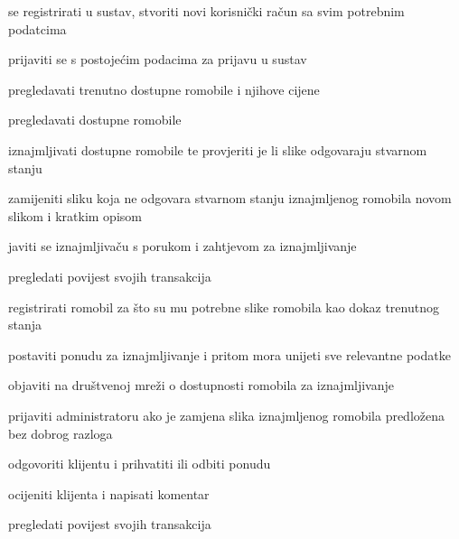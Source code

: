 			\begin{packed_enum}
				\item  {}
				
				\begin{packed_enum}
					
					\item se registrirati u sustav, stvoriti novi korisnički račun sa svim potrebnim podatcima
					\item  prijaviti se s postojećim podacima za prijavu u sustav
					\item  pregledavati trenutno dostupne romobile i njihove cijene

				\end{packed_enum}
			
				\item  {}
				
				\begin{packed_enum}
					
					\item pregledavati dostupne romobile
					\item iznajmljivati dostupne romobile te provjeriti je li slike odgovaraju stvarnom stanju
					\item zamijeniti sliku koja ne odgovara stvarnom stanju iznajmljenog romobila novom slikom i kratkim opisom
					\item javiti se iznajmljivaču s porukom i zahtjevom za iznajmljivanje
					\item pregledati povijest svojih transakcija
					
				\end{packed_enum}

				\item  {}
				
				\begin{packed_enum}
					
					\item registrirati romobil za što su mu potrebne slike romobila kao dokaz trenutnog stanja
					\item postaviti ponudu za iznajmljivanje i pritom mora unijeti sve relevantne podatke
					\item objaviti na društvenoj mreži o dostupnosti romobila za iznajmljivanje
					\item prijaviti administratoru ako je zamjena slika iznajmljenog romobila predložena bez dobrog razloga
					\item odgovoriti klijentu i prihvatiti ili odbiti ponudu
					\item ocijeniti klijenta i napisati komentar
					\item pregledati povijest svojih transakcija


\end{packed_enum}
\end{packed_enum}
